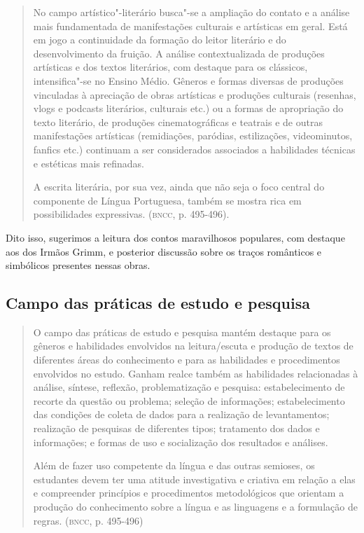 \documentclass[11pt]{extarticle}
\begin{document}
\begin{quote}
No campo artístico"-literário busca"-se a ampliação do contato e a
análise mais fundamentada de manifestações culturais e artísticas em
geral. Está em jogo a continuidade da formação do leitor literário e do
desenvolvimento da fruição. A análise contextualizada de produções
artísticas e dos textos literários, com destaque para os clássicos,
intensifica"-se no Ensino Médio. Gêneros e formas diversas de produções
vinculadas à apreciação de obras artísticas e produções culturais
(resenhas, vlogs e podcasts literários, culturais etc.) ou a formas de
apropriação do texto literário, de produções cinematográficas e teatrais
e de outras manifestações artísticas (remidiações, paródias,
estilizações, videominutos, fanfics etc.) continuam a ser considerados
associados a habilidades técnicas e estéticas mais refinadas.

A escrita literária, por sua vez, ainda que não seja o foco central do
componente de Língua Portuguesa, também se mostra rica em possibilidades
expressivas. (\textsc{bncc}, p. 495-496).
\end{quote}

Dito isso, sugerimos a leitura dos contos maravilhosos populares, com
destaque aos dos Irmãos Grimm, e posterior discussão sobre os traços
românticos e simbólicos presentes nessas obras.


\subsection{Campo das práticas de estudo e pesquisa}

\begin{quote}
O campo das práticas de estudo e pesquisa mantém destaque para os
gêneros e habilidades envolvidos na leitura/escuta e produção de textos
de diferentes áreas do conhecimento e para as habilidades e
procedimentos envolvidos no estudo. Ganham realce também as habilidades
relacionadas à análise, síntese, reflexão, problematização e pesquisa:
estabelecimento de recorte da questão ou problema; seleção de
informações; estabelecimento das condições de coleta de dados para a
realização de levantamentos; realização de pesquisas de diferentes
tipos; tratamento dos dados e informações; e formas de uso e
socialização dos resultados e análises.

Além de fazer uso competente da língua e das outras semioses, os
estudantes devem ter uma atitude investigativa e criativa em relação a
elas e compreender princípios e procedimentos metodológicos que orientam
a produção do conhecimento sobre a língua e as linguagens e a formulação
de regras. (\textsc{bncc}, p. 495-496)
\end{quote}
\end{document}
